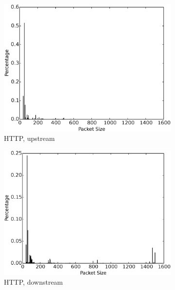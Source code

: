 \begin{figure}
\begin{subfigure}{.16\linewidth}
\includegraphics[width=\linewidth]{image/http_pkt_size_upstream.eps}
\caption{HTTP, upstream}
\label{fig:http_pkt_size_upstream}
\end{subfigure}
\begin{subfigure}{.16\linewidth}
\centering
\includegraphics[width=\linewidth]{image/http_pkt_size_downstream.eps}
\caption{HTTP, downstream}
\label{fig:http_pkt_size_downstream}
\end{subfigure}
\begin{subfigure}{.16\linewidth}
\centering

\end{subfigure}
\end{figure}
